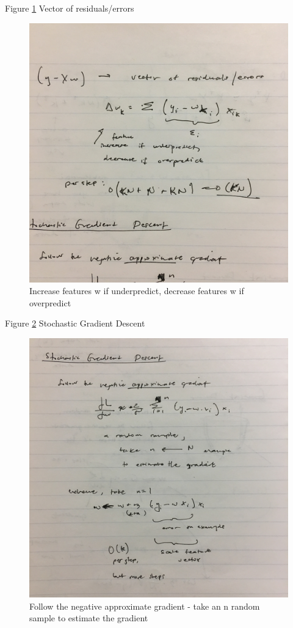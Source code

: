 Figure \ref{fig:example_figure10} Vector of residuals/errors
\begin{figure}[ht]
  \begin{center}
    \includegraphics[width=.9\textwidth,angle=270]{figures/8.jpg}
    \caption{
      Increase features w if underpredict, decrease features w if overpredict }
    \label{fig:example_figure10}
  \end{center}
\end{figure}

\pagebreak

Figure \ref{fig:example_figure11} Stochastic Gradient Descent

\begin{figure}[ht]
  \begin{center}
    \includegraphics[width=.9\textwidth,angle=270]{figures/9.jpg}
    \caption{
      Follow the negative approximate gradient - take an n random sample to estimate the gradient}
    \label{fig:example_figure11}
  \end{center}
\end{figure}

